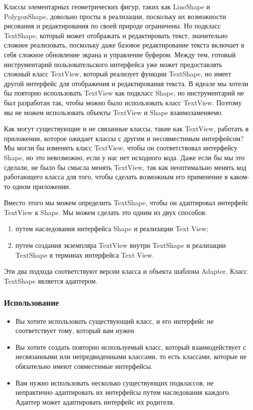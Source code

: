 \documentclass[10pt]{article}
\begin{document}
Классы элементарных геометрических фигур, таких как LineShape и PolygonShape, довольно просты в реализации,
поскольку их возможности рисования и редактирования по своей природе ограничены. Но подкласс TextShape,
который может отображать и редактировать текст, значительно сложнее реализовать, поскольку даже базовое
редактирование текста включает в себя сложное обновление экрана и управление буфером.
Между тем, готовый инструментарий пользовательского интерфейса уже может предоставлять сложный
класс TextView, который реализует функции TextShape, но имеет другой интерфейс
для отображения и редактирования текста. В идеале мы хотели бы повторно использовать
TextView как подкласс Shape, но инструментарий не был разработан так, чтобы можно было
использовать класс TextView. Поэтому мы не можем использовать объекты TextView и Shape взаимозаменяемо.

Как могут существующие и не связанные классы, такие как TextView, работать в приложении,
которое ожидает классы с другим и несовместимым интерфейсом? Мы могли бы изменить класс TextView,
чтобы он соответствовал интерфейсу Shape, но это невозможно, если у нас нет исходного кода.
Даже если бы мы это сделали, не было бы смысла менять TextView, так как неоптимально
менять код работающего класса для того, чтобы сделать возможным его применение в каком-то одном приложении.

Вместо этого мы можем определить TextShape, чтобы он адаптировал интерфейс TextView к Shape.
Мы можем сделать это одним из двух способов:
\begin{enumerate}
	\item путем наследования интерфейса Shape и реализации Text View;
	\item путем создания экземпляра TextView внутри TextShape и реализации TextShape
		в терминах интерфейса Text View.
\end{enumerate}

Эти два подхода соответствуют версии класса и объекта шаблона Adapter. Класс TextShape является адаптером.

\subsubsection{Использование}
\begin{itemize}
	\item Вы хотите использовать существующий класс, и его интерфейс не соответствует тому, 
		который вам нужен
	\item Вы хотите создать повторно используемый класс, который взаимодействует с
		несвязанными или непредвиденными классами, то есть классами, которые не обязательно
		имеют совместимые интерфейсы. 
	\item Вам нужно использовать несколько существующих подклассов, не непрактично адаптировать их
		интерфейсы путем наследования каждого. Адаптер может адаптировать интерфейс их родителя.
\end{itemize}
\end{document}
